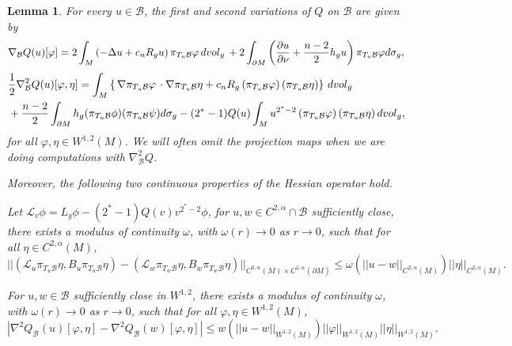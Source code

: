 \documentclass[10pt,a4paper]{amsart}
\newtheorem{lemma}{Lemma}
\newcommand{\B}{\mathcal{B}}
\newcommand{\na}{{\nabla}}
\newcommand{\vol}{{\rm{vol}}}
\newcommand{\vphi}{\varphi}
\begin{document}
\begin{lemma}\label{lem:bm}
    For every $u \in \B$, the first and second variations of $Q$ on $\B$ are given by
    \begin{equation}\label{e:firstvariation}
    \nabla_{\B} Q(u)[\varphi] = 2\int_{M} \left(-\Delta u + c_nR_gu\right)\pi_{T_u\B}\varphi\, d\vol_g\, +2\int_{\partial M} \left( \frac{\partial u}{\partial \nu}+\frac{n-2}{2}h_g u   \right)\pi_{T_u\B}\varphi d\sigma_g ,
    \end{equation}
	\begin{equation}\label{e:secondvariation1}
	\begin{aligned}
	&\frac{1}{2}\nabla_\B^2 Q(u)[\varphi,\eta]
	 = \int_M \left\{  \,\na \pi_{T_u\B}\varphi\,\cdot \na \pi_{T_u\B}\eta + c_n R_g\,(\pi_{T_u\B}\varphi) \,(\pi_{T_u\B}\eta) \right\}\, d\vol_g\\ &+\frac{n-2}{2}\int_{\partial M}h_g(\pi_{T_u\B}\phi) (\pi_{T_u\B}\psi) d\sigma_g-(2^*-1)Q(u)\int_{M} u^{2^*-2}\, (\pi_{T_u\B}\varphi) \,(\pi_{T_u\B}\eta)\, d\vol_g,\end{aligned}
	\end{equation}
 for all $ \varphi,\eta\in W^{1,2}(M)$.	We will often omit the projection maps when we are doing computations with $\nabla_{\B}^2Q$.

 Moreover, the following two continuous properties of the Hessian operator hold.

 Let $\mathcal{L}_v \phi = L_g \phi -(2^*-1)Q(v)v^{2^*-2} \phi $, for $u,w \in C^{2,\alpha} \cap \B$ sufficiently close, there exists a modulus of continuity $\omega$, with $\omega(r) \to 0$ as $r\to 0$, such that  for all $\eta \in C^{2,\alpha}(M)$,
 \begin{equation}\label{prop1}
     ||(\mathcal{L}_u \pi_{T_u{\B}} \eta, B_u \pi_{T_u{\B}} \eta )-(\mathcal{L}_w \pi_{T_w{\B}} \eta, B_w \pi_{T_w{\B}} \eta )||_{C^{0,\alpha}(M) \times C^{1,\alpha}(\partial M)} \leq \omega(||u-w||_{C^{2,\alpha}(M)})||\eta||_{C^{2,\alpha}(M)}.
 \end{equation}

 For $u,w \in \B$ sufficiently close in $W^{1,2}$, there exists a modulus of continuity $\omega$, with $\omega(r) \to 0$ as $r\to 0$, such that  for all $\vphi, \eta \in W^{1,2}(M)$,
 \begin{equation}\label{prop2}
     |\na ^2 Q_\B(u)[\vphi,\eta]-\na ^2 Q_\B(w)[\vphi,\eta]|\leq w(||u-w||_{W^{1,2}(M)})||\vphi||_{W^{1,2}(M)}||\eta||_{W^{1,2}(M)}.
 \end{equation}



\end{lemma}
\end{document}
